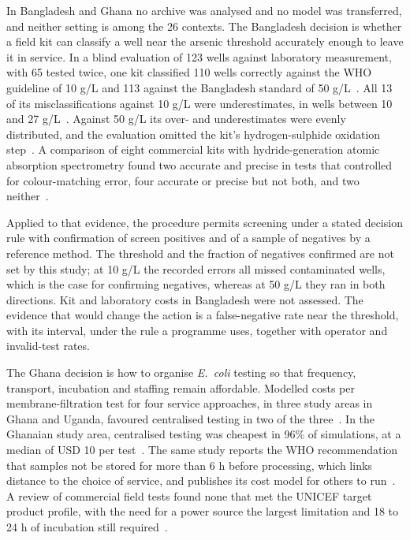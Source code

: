\documentclass[10pt,letterpaper]{article}
\begin{document}
In Bangladesh and Ghana no archive was analysed and no model was transferred, and neither setting is among the 26 contexts. The Bangladesh decision is whether a field kit can classify a well near the arsenic threshold accurately enough to leave it in service. In a blind evaluation of 123 wells against laboratory measurement, with 65 tested twice, one kit classified 110 wells correctly against the WHO guideline of 10 \textmu{}g/L and 113 against the Bangladesh standard of 50 \textmu{}g/L~\cite{George2012}. All 13 of its misclassifications against 10 \textmu{}g/L were underestimates, in wells between 10 and 27 \textmu{}g/L~\cite{George2012}. Against 50 \textmu{}g/L its over- and underestimates were evenly distributed, and the evaluation omitted the kit's hydrogen-sulphide oxidation step~\cite{George2012}. A comparison of eight commercial kits with hydride-generation atomic absorption spectrometry found two accurate and precise in tests that controlled for colour-matching error, four accurate or precise but not both, and two neither~\cite{Reddy2020}.

Applied to that evidence, the procedure permits screening under a stated decision rule with confirmation of screen positives and of a sample of negatives by a reference method. The threshold and the fraction of negatives confirmed are not set by this study; at 10 \textmu{}g/L the recorded errors all missed contaminated wells, which is the case for confirming negatives, whereas at 50 \textmu{}g/L they ran in both directions. Kit and laboratory costs in Bangladesh were not assessed. The evidence that would change the action is a false-negative rate near the threshold, with its interval, under the rule a programme uses, together with operator and invalid-test rates.

The Ghana decision is how to organise \textit{E.~coli} testing so that frequency, transport, incubation and staffing remain affordable. Modelled costs per membrane-filtration test for four service approaches, in three study areas in Ghana and Uganda, favoured centralised testing in two of the three~\cite{Trimmer2024}. In the Ghanaian study area, centralised testing was cheapest in 96\% of simulations, at a median of USD 10 per test~\cite{Trimmer2024}. The same study reports the WHO recommendation that samples not be stored for more than 6 h before processing, which links distance to the choice of service, and publishes its cost model for others to run~\cite{Trimmer2024}. A review of commercial field tests found none that met the UNICEF target product profile, with the need for a power source the largest limitation and 18 to 24 h of incubation still required~\cite{Pichel2023}.
\end{document}
